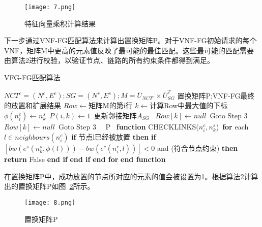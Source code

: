\begin{figure}[H]
    \centering
    \texttt{[image: 7.png]}
    \caption{特征向量乘积计算结果}
    \label{figure:7}
\end{figure}
下一步通过VNF-FG匹配算法来计算出置换矩阵P。对于VNF-FG初始请求的每个VNF，矩阵M中更高的元素值反映了最可能的最佳匹配。这些最可能的匹配需要由算法2进行校验，以验证节点、链路的所有约束条件都得到满足。\par 
\begin{algorithm}[htbp]
    \caption{VFG-FG匹配算法}
    \begin{algorithmic}[1]
    \REQUIRE $NCT^{c}=\left(N^{c}, E^{c}\right) ; S G=\left(N^{s}, E^{s}\right) ; M=\bar{U}_{N C T^{c}} \times \bar{U}_{S G}^{T}$
    \ENSURE  置换矩阵P;VNF-FG最终的放置和扩展结果
    \STATE $Row\leftarrow $矩阵M的第i行
    \STATE $k\leftarrow $计算Row中最大值的下标\
    \STATE$ϕ(n_i^c)\leftarrow n_k^s$\
    \STATE  $P(i,k) \leftarrow 1$\
    \STATE 更新邻接矩阵$A_{SG}$\
    \ELSE
    \STATE $Row[k]\leftarrow null$\
    \STATE Goto Step 3\
    \ENDIF
    \ELSE
    \STATE $Row[k]\leftarrow null$\
    \STATE Goto Step 3\
    \ENDIF
    \ENDFOR\
    \RETURN P\
    \STATE
    \STATE\textbf{function} CHECKLINKS($n_i^c,n_k^s$)\
    \STATE\quad\textbf{for} each $l \in neighbours(n_i^c)$ 
    \STATE\quad\quad\textbf{if} 节点l已经被放置 \textbf{then}
    \STATE\quad\quad\quad\textbf{if} $[bw(e^s (n_k^s,ϕ(l)))-bw(e^c (n_i^c,l))]<0$ and (符合节点约束) \textbf{then}
    \STATE\quad\quad\quad\quad\textbf{return} False
    \STATE\quad\quad\quad\textbf{end if}
    \STATE\quad\quad\textbf{end if}
    \STATE\quad\textbf{end for}
    \STATE\textbf{end function}
    
    \end{algorithmic}
\end{algorithm}\par
在置换矩阵P中，成功放置的节点所对应的元素的值会被设置为1。根据算法2计算出的置换矩阵P如图~\ref{figure:8}所示。\par
\begin{figure}[H]
    \centering
    \texttt{[image: 8.png]}
    \caption{置换矩阵P}
    \label{figure:8}
\end{figure}

